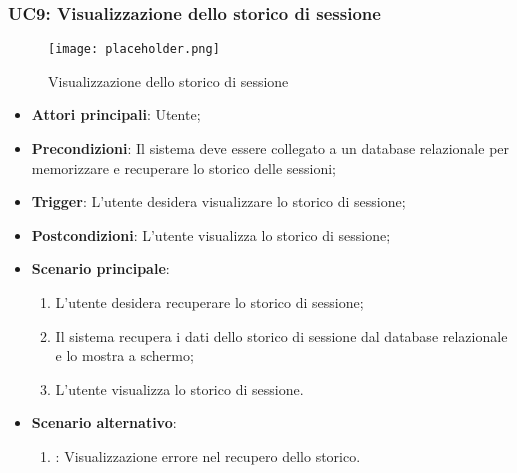 \newpage
\hypertarget{UC9}{}
\subsubsection{UC9: Visualizzazione dello storico di sessione}

\begin{figure}[h]
    \centering
    \texttt{[image: placeholder.png]}
    \caption{Visualizzazione dello storico di sessione}
\end{figure}

\begin{itemize}
    \item \textbf{Attori principali}: Utente;
    \item \textbf{Precondizioni}: Il sistema deve essere collegato a un database relazionale per memorizzare e recuperare lo storico delle sessioni;
    \item \textbf{Trigger}: L'utente desidera visualizzare lo storico di sessione;
    \item \textbf{Postcondizioni}: L'utente visualizza lo storico di sessione;
    \item \textbf{Scenario principale}:
    \begin{enumerate}
        \item L'utente desidera recuperare lo storico di sessione;
        \item Il sistema recupera i dati dello storico di sessione dal database relazionale e lo mostra a schermo;
        \item L'utente visualizza lo storico di sessione.
    \end{enumerate}
    \item \textbf{Scenario alternativo}:
    \begin{enumerate}
        \item {}: Visualizzazione errore nel recupero dello storico.
    \end{enumerate}
\end{itemize}


\hypertarget{UC10}{}
